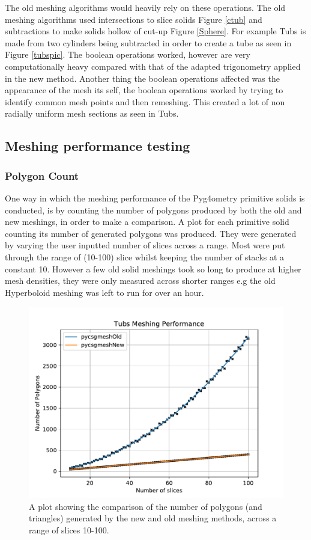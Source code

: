 \documentclass[12pt,a4paper]{article}
\begin{document}
\noindent The old meshing algorithms would heavily rely on these operations. The old meshing algorithms used intersections to slice solids Figure \ref{ctub} and subtractions to make solids hollow of cut-up Figure \ref{Sphere}. For example Tubs is made from two cylinders being subtracted in order to create a tube as seen in Figure \ref{tubspic}. The boolean operations worked, however are very computationally heavy compared with that of the adapted trigonometry applied in the new method. Another thing the boolean operations affected was the appearance of the mesh its self, the boolean operations worked by trying to identify common mesh points and then remeshing. This created a lot of non radially uniform mesh sections as seen in Tubs.\\



\newpage
\subsection{Meshing performance testing}
\subsubsection{Polygon Count}
One way in which the meshing performance of the Pyg4ometry primitive solids is conducted, is by counting the number of polygons produced by both the old and new meshings, in order to make a comparison. A plot for each primitive solid counting its number of generated polygons was produced. They were generated by varying the user inputted number of slices across a range. Most were put through the range of (10-100) slice whilst keeping the number of stacks at a constant 10. However a few old solid meshings took so long to produce at higher mesh densities, they were only measured across shorter ranges e.g the old Hyperboloid meshing was left to run for over an hour.  \\

\begin{figure}[h!]
\centering
\includegraphics[scale=0.6]{Images//Quad_fits//Tubs_quad.pdf}
\caption[width=\columnwidth]{A plot showing the comparison of the number of polygons (and triangles) generated by the new and old meshing methods, across a range of slices 10-100.}
\label{conts}
\end{figure}
\end{document}

